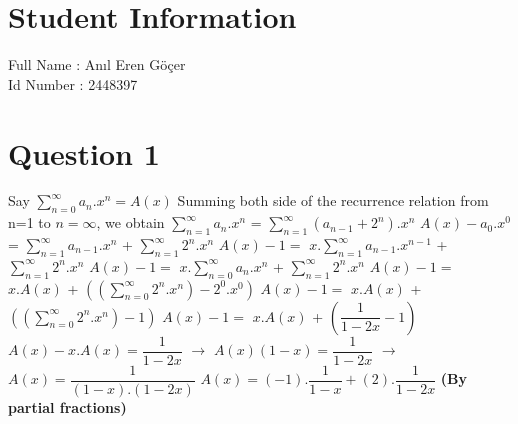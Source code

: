 \documentclass[11pt]{article}
\begin{document}
\section*{Student Information } 
Full Name : Anıl Eren Göçer \\
Id Number : 2448397  \\


\section*{Question 1}
\noindent Say $\sum\limits^{\infty}_{n=0}{a_n.x^n} = A(x)$ \newline \newline
Summing both side of the recurrence relation from n=1 to $n=\infty$, we obtain \newline \newline
$\sum\limits^{\infty}_{n=1}{a_n.x^n}$ = $\sum\limits^{\infty}_{n=1}{(a_{n-1} + 2^n).x^n}$ \newline \newline
$A(x) - a_0.x^0$ = $\sum\limits^{\infty}_{n=1}{a_{n-1}.x^n}$ + $\sum\limits^{\infty}_{n=1}{2^n.x^n}$\newline \newline
$A(x) - 1 = $ $x.\sum\limits^{\infty}_{n=1}{a_{n-1}.x^{n-1}}$ + $\sum\limits^{\infty}_{n=1}{2^n.x^n}$ \newline \newline
$A(x) - 1 = $ $x.\sum\limits^{\infty}_{n=0}{a_n.x^n}$ + $\sum\limits^{\infty}_{n=1}{2^n.x^n}$\newline \newline
$A(x) - 1 = $ $x.A(x)$ + $((\sum\limits^{\infty}_{n=0}{2^n.x^n}) - 2^0.x^0)$ \newline \newline
$A(x) - 1 = $ $x.A(x)$ + $((\sum\limits^{\infty}_{n=0}{2^n.x^n}) - 1)$ \newline \newline
$A(x) - 1 = $ $x.A(x)$ + $(\dfrac{1}{1-2x} - 1)$ \newline \newline
$A(x) - x.A(x) = \dfrac{1}{1-2x}$ \space \space \space $\xrightarrow{}$ \space \space $A(x)(1-x) = \dfrac{1}{1-2x}$ \space \space \space $\xrightarrow{}$ \space \space $A(x) = \dfrac{1}{(1-x).(1-2x)}$ \newline \newline
$A(x) = (-1).\dfrac{1}{1-x} + (2).\dfrac{1}{1-2x}$ \space \space \space  \textbf{(By partial fractions)} \newline \newline
\end{document}

